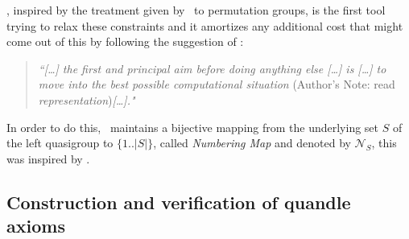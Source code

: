 \Software, inspired by the treatment given by \magma~to permutation groups, is the first tool trying to relax these constraints and it amortizes any additional cost that might come out of this by following the suggestion of \cite{holt2005handbook}: \newpage

\begin{quote}
    \emph{``[\dots] the first and principal aim before doing anything else [\dots] is [\dots] to move into the best possible computational situation} (Author's Note: read \emph{representation})\emph{[\dots]."}
\end{quote}
In order to do this, \Software~maintains a bijective mapping from the underlying set $S$ of the left quasigroup to $\{1 .. |S|\}$, called \emph{Numbering Map} and denoted by $\mathcal{N}_S$, this was inspired by \magma.



\subsection{Construction and verification of quandle axioms}
